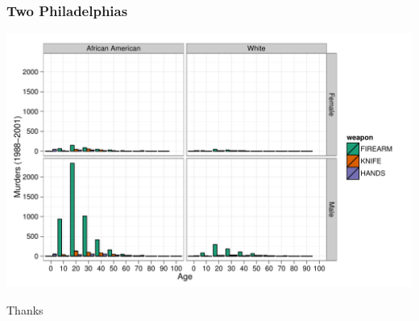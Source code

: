 \documentclass[]{beamer}
\newenvironment{knitrout}{}{} %
\renewenvironment{knitrout}{\begin{footnotesize}}{\end{footnotesize}}
\begin{document}
\begin{frame}
	\frametitle{Two Philadelphias}



\begin{knitrout}
\color{fgcolor}\includegraphics[width=\linewidth]{figures/murder-unnamed-chunk-18} 
\end{knitrout}


\end{frame}



\begin{frame}{}
	\begin{center}
		{\Huge Thanks}
	\end{center}
\end{frame}
\end{document}
